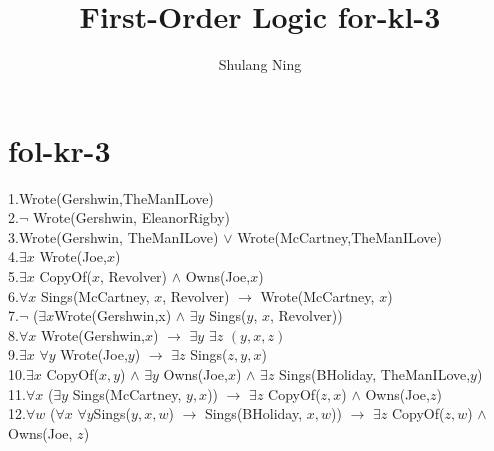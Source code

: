 \documentclass[11pt]{article}
\title{First-Order Logic for-kl-3}
\author{Shulang Ning}
\begin{document}
        
    \maketitle

    \section{fol-kr-3}
    1.Wrote(Gershwin,TheManILove)\\
    2.$\neg$ Wrote(Gershwin, EleanorRigby)\\
    3.Wrote(Gershwin, TheManILove) $\lor$ Wrote(McCartney,TheManILove)\\
    4.$\exists x$ Wrote(Joe,$x$)\\
    5.$\exists x$ CopyOf($x$, Revolver) $\land$ Owns(Joe,$x$)\\
    6.$\forall x$ Sings(McCartney, $x$, Revolver) $\rightarrow$ Wrote(McCartney, $x$)\\
    7.$\neg$ ($\exists x$Wrote(Gershwin,x) $\land$ $\exists y$ Sings($y$, $x$, Revolver))\\
    8.$\forall x$ Wrote(Gershwin,$x$) $\rightarrow$ $\exists y$ $\exists z$ $(y,x,z)$\\
    9.$\exists x$ $\forall y$ Wrote(Joe,$y$) $\rightarrow$ $\exists z$ Sings($z,y,x$)\\
    10.$\exists x$ CopyOf($x,y$) $\land$ $\exists y$ Owns(Joe,$x$) $\land$ $\exists z$ Sings(BHoliday, TheManILove,$y$)\\
    11.$\forall x$ ($\exists y$ Sings(McCartney, $y, x$)) $\rightarrow$ $\exists z$ CopyOf($z,x$) $\land$ Owns(Joe,$z$)\\
    12.$\forall w$ ($\forall x$ $\forall y$Sings($y,x,w$) $\rightarrow$ Sings(BHoliday, $x, w$)) $\rightarrow$ $\exists z$ CopyOf($z,w$) $\land$ Owns(Joe, $z$)



    




    
\end{document}
